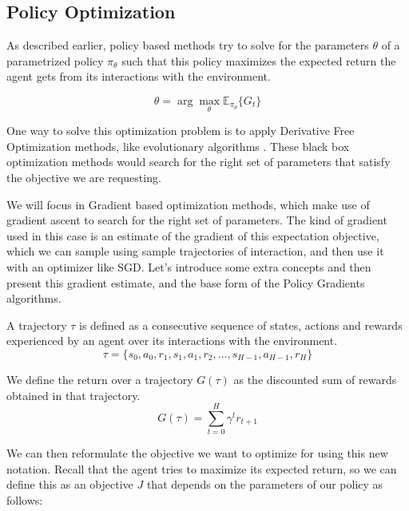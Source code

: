 \subsection{Policy Optimization}
\label{ref:subs:ch2:PolicyBasedMethods}

As described earlier, policy based methods try to solve for the parameters $\theta$
of a parametrized policy $\pi_{\theta}$ such that this policy maximizes the expected
return the agent gets from its interactions with the environment.

\begin{equation}
    \theta = \arg \max_\theta \mathbb{E}_{\pi_{\theta}} \lbrace G_{t} \rbrace
\end{equation}

One way to solve this optimization problem is to apply Derivative Free Optimization
methods, like evolutionary algorithms . These black box optimization methods would
search for the right set of parameters that satisfy the objective we are requesting.

We will focus in Gradient based optimization methods, which make use of gradient
ascent to search for the right set of parameters. The kind of gradient used in this
case is an estimate of the gradient of this expectation objective, which we can sample
using sample trajectories of interaction, and then use it with an optimizer like
SGD. Let's introduce some extra concepts and then present this gradient estimate,
and the base form of the Policy Gradients algorithms.

\begin{definition}
    A trajectory $\tau$ is defined as a consecutive sequence of states, actions 
    and rewards experienced by an agent over its interactions with the environment.
    \begin{equation}
        \tau = \lbrace s_{0},a_{0},r_{1},s_{1},a_{1},r_{2},\hdots,s_{H-1},a_{H-1},r_{H} \rbrace
    \end{equation}
\end{definition}

\begin{definition}
    We define the return over a trajectory $G(\tau)$ as the discounted sum of
    rewards obtained in that trajectory.
    \begin{equation}
        G(\tau) = \sum_{t=0}^{H} \gamma^{t} r_{t+1}
    \end{equation}
\end{definition}

We  can then reformulate the objective we want to optimize for using this new notation.
Recall that the agent tries to maximize its expected return, so we can define this as
an objective $J$ that depends on the parameters of our policy as follows:

